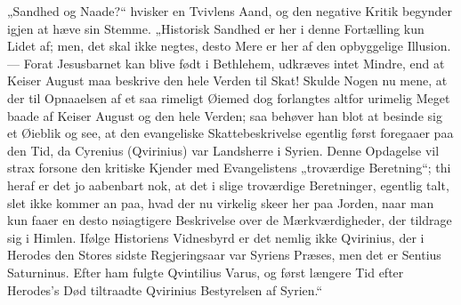 \documentclass[12pt,a4paper]{book}
\begin{document}
„Sandhed og Naade?“ hvisker en Tvivlens Aand, og den negative Kritik begynder
igjen at hæve sin Stemme. „Historisk Sandhed er her i denne Fortælling kun Lidet
af; men, det skal ikke negtes, desto Mere er her af den opbyggelige Illusion. ---
Forat Jesusbarnet kan blive født i Bethlehem, udkræves intet Mindre, end at
Keiser August maa beskrive den hele Verden til Skat! Skulde Nogen nu mene, at der
til Opnaaelsen af et saa rimeligt Øiemed dog forlangtes altfor urimelig Meget
baade af Keiser August og den hele Verden; saa behøver han blot at besinde sig et
Øieblik og see, at den evangeliske Skattebeskrivelse egentlig først foregaaer paa
den Tid, da Cyrenius (Qvirinius) var Landsherre i Syrien. Denne Opdagelse vil
strax forsone den kritiske Kjender med Evangelistens „troværdige Beretning“; thi
heraf er det jo aabenbart nok, at det i slige troværdige Beretninger, egentlig
talt, slet ikke kommer an paa, hvad der nu virkelig skeer her paa Jorden, naar
man kun faaer en desto nøiagtigere Beskrivelse over de Mærkværdigheder, der
tildrage sig i Himlen. Ifølge Historiens Vidnesbyrd er det nemlig ikke Qvirinius,
der i Herodes den Stores sidste Regjeringsaar var Syriens Præses, men det er
Sentius Saturninus. Efter ham fulgte Qvintilius Varus, og først længere Tid efter
Herodes's Død tiltraadte Qvirinius Bestyrelsen af Syrien.“
\end{document}
